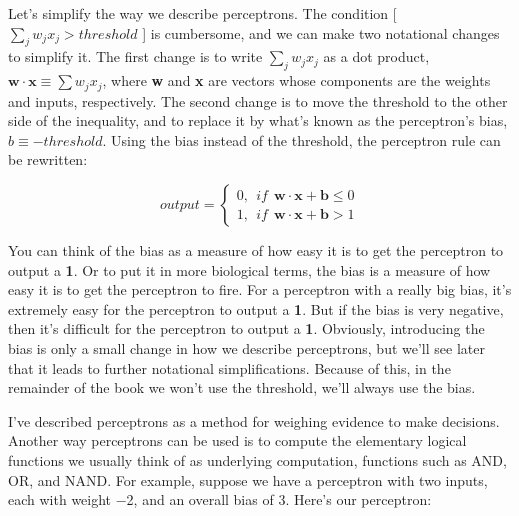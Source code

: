 \documentclass[a4paper,12pt]{report}%
\begin{document}
Let's simplify the way we describe perceptrons. The condition [ $\sum_{j} w_{j}x_{j} > threshold$ ] is cumbersome, and we can make two notational changes to simplify it. The first change is to write $\sum_{j} w_{j}x_{j}$ as a dot product, $ \mathbf{w} \cdot \mathbf{x} \equiv \sum w_{j}x_{j}$, where \textbf{w} and \textbf{x} are vectors whose components are the weights and inputs, respectively. The second change is to move the threshold to the other side of the inequality, and to replace it by what's known as the perceptron's bias, $b \equiv  - threshold$. Using the bias instead of the threshold, the perceptron rule can be rewritten:


\begin{center}
 \begin{equation}
  output    =   \begin{cases}
                0, ~~ if ~~ \mathbf{w} \cdot \mathbf{x} + \mathbf{b} \le 0 \\
                1, ~~ if ~~ \mathbf{w} \cdot \mathbf{x} + \mathbf{b} > 1
                \end{cases}
 \end{equation}
\end{center}


You can think of the bias as a measure of how easy it is to get the perceptron to output a \textbf{1}. Or to put it in more biological terms, the bias is a measure of how easy it is to get the perceptron to fire. For a perceptron with a really big bias, it's extremely easy for the perceptron to output a \textbf{1}. But if the bias is very negative, then it's difficult for the perceptron to output a \textbf{1}. Obviously, introducing the bias is only a small change in how we describe perceptrons, but we'll see later that it leads to further notational simplifications. Because of this, in the remainder of the book we won't use the threshold, we'll always use the bias.

I've described perceptrons as a method for weighing evidence to make decisions. Another way perceptrons can be used is to compute the elementary logical functions we usually think of as underlying computation, functions such as AND, OR, and NAND. For example, suppose we have a perceptron with two inputs, each with weight −2, and an overall bias of 3. Here's our perceptron:
\end{document}
